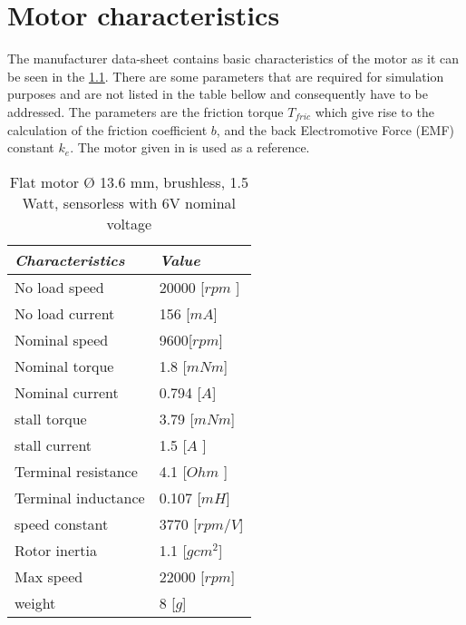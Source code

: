 \chapter{Motor characteristics}\label{chap: B}
%
The manufacturer data-sheet contains basic characteristics of the motor as it can be seen in the \ref{table:forfor}. There are some parameters that are required for simulation purposes and are not listed in the table bellow and consequently have to be addressed. The parameters are the friction torque $T_{fric}$ which give rise to the calculation of the friction coefficient $b$, and the back Electromotive Force (EMF) constant $k_{e}$. The motor given in \cite{motchar} is used as a reference.    
%
\begin{table}[H]
	\centering
	\begin{tabular}{|l|l|}
		\hline
		\textit{\textbf{Characteristics}}  & \textit{\textbf{Value}}                     				\\ \hline
		No load speed                      & 20000 {[}$rpm$ {]}                      					\\ \hline
		No load current                    & 156 {[}$mA${]}                             				\\ \hline
		Nominal speed                     	& 9600{[}$rpm${]}                                         	\\ \hline
		Nominal torque                     		& 1.8 [$mNm$]                                    		\\ \hline
		Nominal current                  	      & 0.794 {[}$A${]}  	
		\\ \hline
		stall torque                  	      & 3.79 {[}$mNm${]}                               			\\ \hline
		stall current                   & 1.5 {[}$A$ {]}                                     		
		 \\ \hline
		Terminal resistance  & 4.1 {[}$Ohm$ {]}                            				
		\\ \hline
		Terminal inductance     & 0.107 {[}$mH${]}                           	  				
		\\ \hline
		speed constant             & 3770 {[}$rpm/V${]}   					    \\ \hline
		Rotor inertia & 1.1 {[}$gc m^{2}${]}                               	
		 \\ \hline
		 Max speed  & 22000 {[}$rpm${]}                               	
		 \\ \hline
		 weight  & 8 {[}$g${]}                               	
		 \\ \hline
	\end{tabular}
	\caption{Flat motor $Ø$ 13.6 mm, brushless, 1.5 Watt, sensorless with 6V nominal voltage}
	\label{table:forfor}
\end{table}
